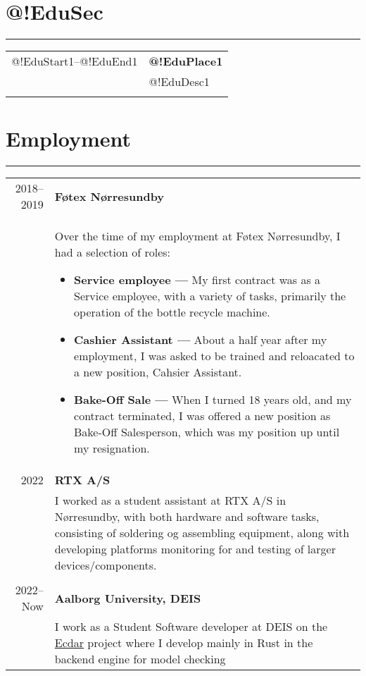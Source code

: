 \documentclass{article}
\begin{document}
\section*{@!EduSec}
\hrule width5cm%
\begin{longtabu} to \textwidth {r|X}
@!EduStart1--@!EduEnd1 & \textbf{@!EduPlace1} \\ & @!EduDesc1 \\\\
\end{longtabu}
 
\section*{Employment}
\hrule width5cm

\begin{longtabu} to \textwidth {r|X}
2018--2019 & \textbf{Føtex Nørresundby}\\
&   Over the time of my employment at Føtex Nørresundby, I had a selection of roles:
        \begin{itemize}\setlength\itemsep{0em}
            \item[] \textbf{Service employee --- } My first contract was as a Service employee,
                with a variety of tasks, primarily the operation of the bottle recycle machine.
            \item[] \textbf{Cashier Assistant --- } About a half year after my employment,
                I was asked to be trained and reloacated to a new position, Cahsier Assistant.
            \item[] \textbf{Bake-Off Sale --- } When I turned 18 years old, and my contract
                terminated, I was offered a new position as Bake-Off Salesperson, which was my
                position up until my resignation.
        \end{itemize} \\
    2022 & \textbf{RTX A/S}\\
    &   I worked as a student assistant at RTX A/S in Nørresundby, with both hardware and software tasks,
        consisting of soldering og assembling equipment, along with developing platforms monitoring for and testing of larger devices/components. \\\\
2022--Now & \textbf{Aalborg University, DEIS}\\
    &   I work as a Student Software developer at DEIS on the \href{https://github.com/Ecdar}{Ecdar} project
    where I develop mainly in Rust in the backend engine for model checking

\end{longtabu}
\end{document}
